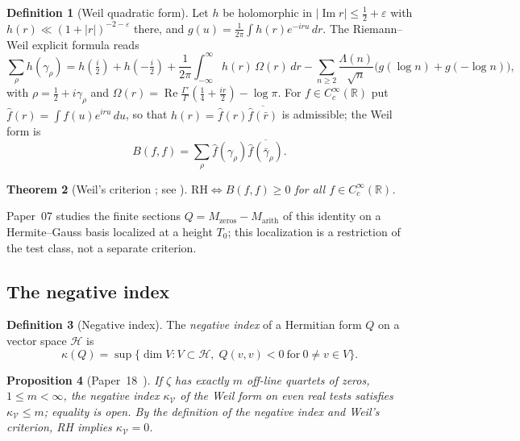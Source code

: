 \documentclass[11pt]{amsart}
\newtheorem{theorem}{Theorem}[section]
\newtheorem{proposition}[theorem]{Proposition}
\theoremstyle{definition}
\newtheorem{definition}[theorem]{Definition}
\theoremstyle{remark}
\newcommand{\RH}{\mathrm{RH}}
\renewcommand{\Re}{\operatorname{Re}}
\renewcommand{\Im}{\operatorname{Im}}
\newcommand{\half}{\tfrac{1}{2}}
\newcommand{\kap}{\kappa}
\newcommand{\gam}{\gamma}
\newcommand{\Lam}{\Lambda}
\newcommand{\eps}{\varepsilon}
\newcommand{\kV}{\kappa_{\mathcal V}}
\begin{document}
\begin{definition}[Weil quadratic form]
Let $h$ be holomorphic in $|\Im r|\le\half+\eps$ with $h(r)\ll(1+|r|)^{-2-\eps}$ there,
and $g(u)=\frac1{2\pi}\int h(r)e^{-iru}\,dr$. The Riemann--Weil explicit formula reads
\[
  \sum_\rho h(\gam_\rho)=h(\tfrac i2)+h(-\tfrac i2)+\frac1{2\pi}\int_{-\infty}^\infty
  h(r)\,\Omega(r)\,dr-\sum_{n\ge2}\frac{\Lam(n)}{\sqrt n}\bigl(g(\log n)+g(-\log n)\bigr),
\]
with $\rho=\half+i\gam_\rho$ and
$\Omega(r)=\Re\frac{\Gamma'}{\Gamma}(\tfrac14+\tfrac{ir}2)-\log\pi$. For $f\in
C_c^\infty(\mathbb R)$ put $\hat f(r)=\int f(u)e^{iru}\,du$, so that
$h(r)=\hat f(r)\overline{\hat f(\bar r)}$ is admissible; the Weil form is
\begin{equation}
  \label{eq:weil-form}
  B(f,f)=\sum_\rho \hat f(\gam_\rho)\overline{\hat f(\bar\gam_\rho)} .
\end{equation}
\end{definition}

\begin{theorem}[Weil's criterion \cite{Weil52}; see \cite{Bom00}]
$\RH \Longleftrightarrow B(f,f) \ge 0$ for all $f\in C_c^\infty(\mathbb R)$.
\end{theorem}

Paper~07 studies the finite sections $Q=M_{\mathrm{zeros}}-M_{\mathrm{arith}}$ of this
identity on a Hermite--Gauss basis localized at a height $T_0$; this localization is a
restriction of the test class, not a separate criterion.

\subsection{The negative index}
\label{ss:Krein}

\begin{definition}[Negative index]
\label{def:index}
The \emph{negative index} of a Hermitian form $Q$ on a vector space $\mathcal{H}$ is
\[
  \kap(Q) = \sup\{\dim V : V\subset\mathcal{H},\; Q(v,v)<0\ \text{for}\ 0\ne v\in V\}.
\]
\end{definition}

\begin{proposition}[{Paper~18~\cite[Cor.~6.5 and Prop.~7.2]{P18}}]
\label{thm:kappa}
If $\zeta$ has exactly $m$ off-line quartets of zeros, $1\le m<\infty$, the negative index
$\kV$ of the Weil form on even real tests satisfies $\kV\le m$; equality is open. By the
definition of the negative index and Weil's criterion, RH implies $\kV=0$.
\end{proposition}
\end{document}
